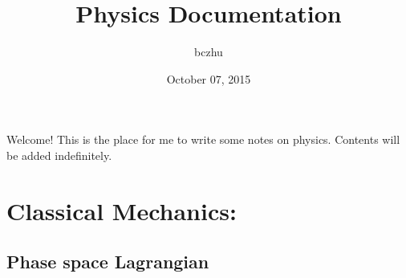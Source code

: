 \documentclass[letterpaper,10pt,english]{sphinxmanual}
\title{Physics Documentation}
\date{October 07, 2015}
\author{bczhu}
\begin{document}
\maketitle
\tableofcontents
{}\label{index::doc}


Welcome! This is the place for me to write some notes on physics. Contents will be added indefinitely.


\chapter{Classical Mechanics:}
\label{index:classical-mechanics}\label{index:notes-on-physics}

\section{Phase space Lagrangian}
\label{CM/Lagrangian::doc}\label{CM/Lagrangian:phase-space-lagrangian}\label{CM/Lagrangian:id1}
\end{document}
